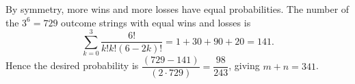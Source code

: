 By symmetry, more wins and more losses have equal probabilities. The number of the $3^6=729$ outcome strings with equal wins and losses is
\[
\sum_{k=0}^3\dfrac{6!}{k!k!(6-2k)!}=1+30+90+20=141.
\]
Hence the desired probability is $\dfrac{(729-141)}{(2\cdot729)}=\dfrac{98}{243}$, giving $\boxed{m+n=341}$.
